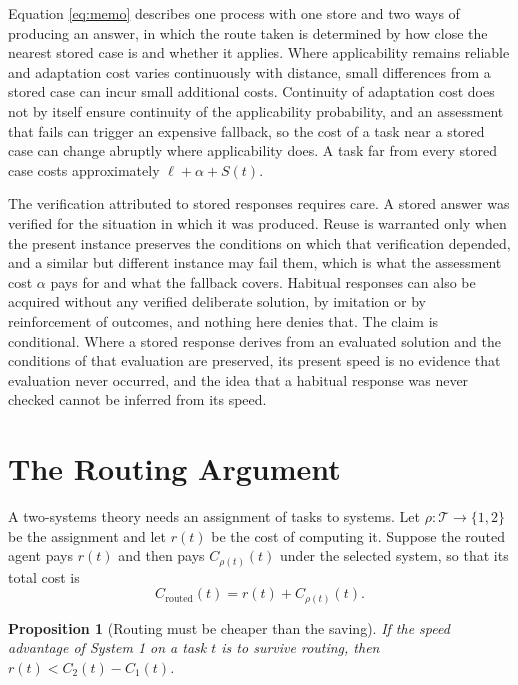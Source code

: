 \documentclass[11pt]{article}
\newtheorem{proposition}{Proposition}
\theoremstyle{definition}
\newcommand{\T}{\mathcal{T}}
\begin{document}
Equation \eqref{eq:memo} describes one process with one store and two ways of producing an answer, in which the route taken is determined by how close the nearest stored case is and whether it applies. Where applicability remains reliable and adaptation cost varies continuously with distance, small differences from a stored case can incur small additional costs. Continuity of adaptation cost does not by itself ensure continuity of the applicability probability, and an assessment that fails can trigger an expensive fallback, so the cost of a task near a stored case can change abruptly where applicability does. A task far from every stored case costs approximately $\ell+\alpha+S(t)$.

The verification attributed to stored responses requires care. A stored answer was verified for the situation in which it was produced. Reuse is warranted only when the present instance preserves the conditions on which that verification depended, and a similar but different instance may fail them, which is what the assessment cost $\alpha$ pays for and what the fallback covers. Habitual responses can also be acquired without any verified deliberate solution, by imitation or by reinforcement of outcomes, and nothing here denies that. The claim is conditional. Where a stored response derives from an evaluated solution and the conditions of that evaluation are preserved, its present speed is no evidence that evaluation never occurred, and the idea that a habitual response was never checked cannot be inferred from its speed.

\section{The Routing Argument}

A two-systems theory needs an assignment of tasks to systems. Let $\rho:\T\to\{1,2\}$ be the assignment and let $r(t)$ be the cost of computing it. Suppose the routed agent pays $r(t)$ and then pays $C_{\rho(t)}(t)$ under the selected system, so that its total cost is
\begin{equation}
C_{\mathrm{routed}}(t)=r(t)+C_{\rho(t)}(t).
\end{equation}

\begin{proposition}[Routing must be cheaper than the saving]
If the speed advantage of System 1 on a task $t$ is to survive routing, then $r(t)<C_{2}(t)-C_{1}(t)$.
\end{proposition}
\end{document}
